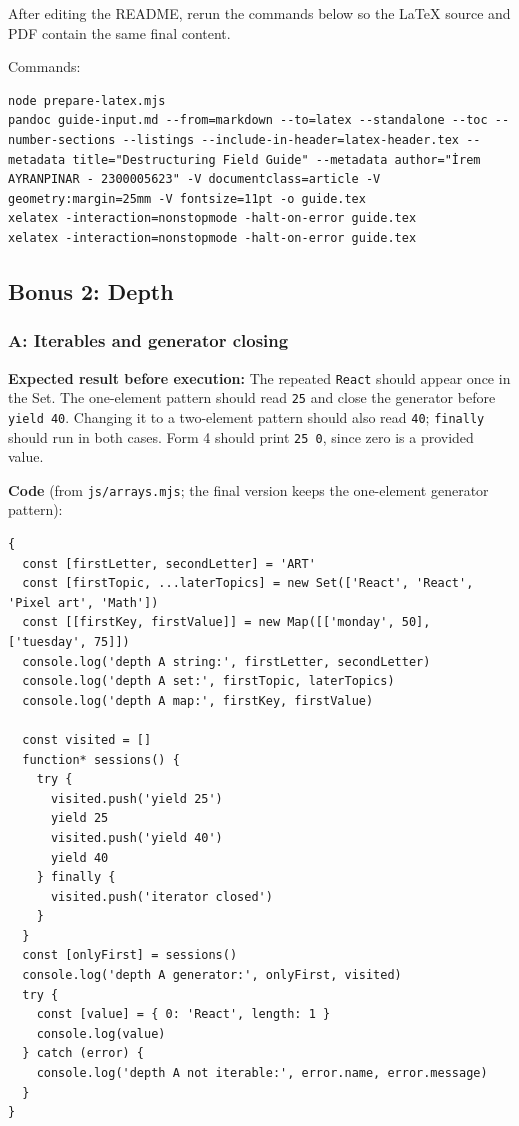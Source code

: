 \documentclass[
  11pt,
]{article}
\newcommand{\passthrough}[1]{#1}
\begin{document}
After editing the README, rerun the commands below so the LaTeX source
and PDF contain the same final content.

Commands:

\begin{lstlisting}
node prepare-latex.mjs
pandoc guide-input.md --from=markdown --to=latex --standalone --toc --number-sections --listings --include-in-header=latex-header.tex --metadata title="Destructuring Field Guide" --metadata author="İrem AYRANPINAR - 2300005623" -V documentclass=article -V geometry:margin=25mm -V fontsize=11pt -o guide.tex
xelatex -interaction=nonstopmode -halt-on-error guide.tex
xelatex -interaction=nonstopmode -halt-on-error guide.tex
\end{lstlisting}

\subsection{Bonus 2: Depth}\label{bonus-2-depth}

\subsubsection{A: Iterables and generator
closing}\label{a-iterables-and-generator-closing}

\textbf{Expected result before execution:} The repeated
\passthrough{\lstinline!React!} should appear once in the Set. The
one-element pattern should read \passthrough{\lstinline!25!} and close
the generator before \passthrough{\lstinline!yield 40!}. Changing it to
a two-element pattern should also read \passthrough{\lstinline!40!};
\passthrough{\lstinline!finally!} should run in both cases. Form 4
should print \passthrough{\lstinline!25 0!}, since zero is a provided
value.

\textbf{Code} (from \passthrough{\lstinline!js/arrays.mjs!}; the final
version keeps the one-element generator pattern):

\begin{lstlisting}
{
  const [firstLetter, secondLetter] = 'ART'
  const [firstTopic, ...laterTopics] = new Set(['React', 'React', 'Pixel art', 'Math'])
  const [[firstKey, firstValue]] = new Map([['monday', 50], ['tuesday', 75]])
  console.log('depth A string:', firstLetter, secondLetter)
  console.log('depth A set:', firstTopic, laterTopics)
  console.log('depth A map:', firstKey, firstValue)

  const visited = []
  function* sessions() {
    try {
      visited.push('yield 25')
      yield 25
      visited.push('yield 40')
      yield 40
    } finally {
      visited.push('iterator closed')
    }
  }
  const [onlyFirst] = sessions()
  console.log('depth A generator:', onlyFirst, visited)
  try {
    const [value] = { 0: 'React', length: 1 }
    console.log(value)
  } catch (error) {
    console.log('depth A not iterable:', error.name, error.message)
  }
}
\end{lstlisting}
\end{document}
